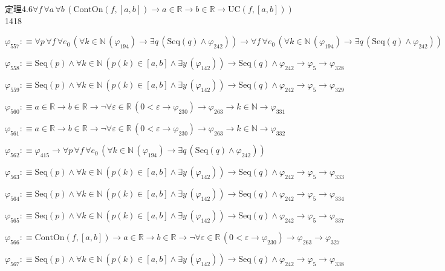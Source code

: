 \begin{fullproof}{定理4.6}{$\forall f\,\forall a\,\forall b\,(\mathrm{ContOn}(f,[a,b]) \to a \in \mathbb{R} \to b \in \mathbb{R} \to \mathrm{UC}(f,[a,b]))$}{1418}
\begin{abbrevlist}
\item $\varphi_{557} :\equiv \forall p\,\forall f\,\forall e_{0}\,(\forall k \in \mathbb{N}\,(\varphi_{194}) \to \exists q\,(\mathrm{Seq}(q) \land \varphi_{242})) \to \forall f\,\forall e_{0}\,(\forall k \in \mathbb{N}\,(\varphi_{194}) \to \exists q\,(\mathrm{Seq}(q) \land \varphi_{242}))$
\item $\varphi_{558} :\equiv \mathrm{Seq}(p) \land \forall k \in \mathbb{N}\,(p(k) \in [a,b] \land \exists y\,(\varphi_{142})) \to \mathrm{Seq}(q) \land \varphi_{242} \to \varphi_{5} \to \varphi_{328}$
\item $\varphi_{559} :\equiv \mathrm{Seq}(p) \land \forall k \in \mathbb{N}\,(p(k) \in [a,b] \land \exists y\,(\varphi_{142})) \to \mathrm{Seq}(q) \land \varphi_{242} \to \varphi_{5} \to \varphi_{329}$
\item $\varphi_{560} :\equiv a \in \mathbb{R} \to b \in \mathbb{R} \to \neg \forall \varepsilon \in \mathbb{R}\,(0 < \varepsilon \to \varphi_{230}) \to \varphi_{263} \to k \in \mathbb{N} \to \varphi_{331}$
\item $\varphi_{561} :\equiv a \in \mathbb{R} \to b \in \mathbb{R} \to \neg \forall \varepsilon \in \mathbb{R}\,(0 < \varepsilon \to \varphi_{230}) \to \varphi_{263} \to k \in \mathbb{N} \to \varphi_{332}$
\item $\varphi_{562} :\equiv \varphi_{415} \to \forall p\,\forall f\,\forall e_{0}\,(\forall k \in \mathbb{N}\,(\varphi_{194}) \to \exists q\,(\mathrm{Seq}(q) \land \varphi_{242}))$
\item $\varphi_{563} :\equiv \mathrm{Seq}(p) \land \forall k \in \mathbb{N}\,(p(k) \in [a,b] \land \exists y\,(\varphi_{142})) \to \mathrm{Seq}(q) \land \varphi_{242} \to \varphi_{5} \to \varphi_{333}$
\item $\varphi_{564} :\equiv \mathrm{Seq}(p) \land \forall k \in \mathbb{N}\,(p(k) \in [a,b] \land \exists y\,(\varphi_{142})) \to \mathrm{Seq}(q) \land \varphi_{242} \to \varphi_{5} \to \varphi_{334}$
\item $\varphi_{565} :\equiv \mathrm{Seq}(p) \land \forall k \in \mathbb{N}\,(p(k) \in [a,b] \land \exists y\,(\varphi_{142})) \to \mathrm{Seq}(q) \land \varphi_{242} \to \varphi_{5} \to \varphi_{337}$
\item $\varphi_{566} :\equiv \mathrm{ContOn}(f,[a,b]) \to a \in \mathbb{R} \to b \in \mathbb{R} \to \neg \forall \varepsilon \in \mathbb{R}\,(0 < \varepsilon \to \varphi_{230}) \to \varphi_{263} \to \varphi_{327}$
\item $\varphi_{567} :\equiv \mathrm{Seq}(p) \land \forall k \in \mathbb{N}\,(p(k) \in [a,b] \land \exists y\,(\varphi_{142})) \to \mathrm{Seq}(q) \land \varphi_{242} \to \varphi_{5} \to \varphi_{338}$

\end{abbrevlist}
\end{fullproof}
